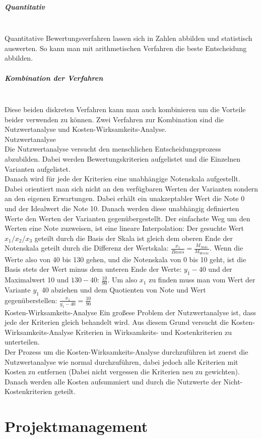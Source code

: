\documentclass{article}
\newcommand{\subparagraphlb}[1]{\subparagraph{#1}\mbox{}\\}
\begin{document}
	\subparagraphlb{Quantitativ}
	Quantitative Bewertungsverfahren lassen sich in Zahlen abbilden und statistisch auswerten. So kann man mit arithmetischen Verfahren die beste Entscheidung abbilden.
	\subparagraphlb{Kombination der Verfahren}
	Diese beiden diskreten Verfahren kann man auch kombinieren um die Vorteile beider verwenden zu können. Zwei Verfahren zur Kombination sind die Nutzwertanalyse und Kosten-Wirksamkeits-Analyse. \\
	{\bold \Large Nutzwertanalyse} \\
	Die Nutzwertanalyse versucht den menschlichen Entscheidungsprozess abzubilden. Dabei werden Bewertungskriterien aufgelistet und die Einzelnen Varianten aufgelistet. \\
	Danach wird für jede der Kriterien eine unabhängige Notenskala aufgestellt. Dabei orientiert man sich nicht an den verfügbaren Werten der Varianten sondern an den eigenen Erwartungen. Dabei erhält ein unakzeptabler Wert die Note 0 und der Idealwert die Note 10. Danach werden diese unabhängig definierten Werte den Werten der Varianten gegenübergestellt. Der einfachste Weg um den Werten eine Note zuzweisen, ist eine lineare Interpolation: Der gesuchte Wert $x_1/x_2/x_3$ geteilt durch die Basis der Skala ist gleich dem oberen Ende der Notenskala geteilt durch die Differenz der Wertskala: $\frac{x_1}{Basis}=\frac{M_{Note}}{M_{Werte}}$. Wenn die Werte also von 40 bis 130 gehen, und die Notenskala von 0 bis 10 geht, ist die Basis stets der Wert minus dem unteren Ende der Werte: $y_1-40$ und der Maximalwert 10 und $130-40$: $\frac{10}{90}$. Um also $x_1$ zu finden muss man vom Wert der Variante $y_1$ 40 abziehen und dem Quotienten von Note und Wert gegenüberstellen: $\frac{x_1}{y_1-40}=\frac{10}{90}$ \\
	{\bold \Large Kosten-Wirksamkeits-Analyse}
	Ein großese Problem der Nutzwertanalyse ist, dass jede der Kriterien gleich behandelt wird. Aus diesem Grund versucht die Kosten-Wirksamkeits-Analyse Kriterien in Wirksamkeits- und Kostenkriterien zu unterteilen. \\
	Der Prozess um die Kosten-Wirksamkeits-Analyse durchzuführen ist zuerst die Nutzwertanalyse wie normal durchzuführen, dabei jedoch alle Kriterien mit Kosten zu entfernen (Dabei nicht vergessen die Kriterien neu zu gewichten). Danach werden alle Kosten aufsummiert und durch die Nutzwerte der Nicht-Kostenkriterien geteilt.
	\section{Projektmanagement}























  
\end{document}
